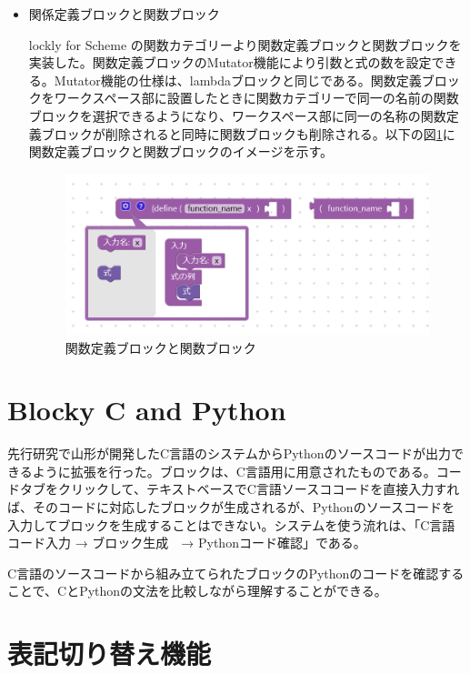 \documentclass{risepaper}
\begin{document}
\begin{itemize}
\item 関係定義ブロックと関数ブロック

lockly for Scheme の関数カテゴリーより関数定義ブロックと関数ブロックを実装した。関数定義ブロックのMutator機能により引数と式の数を設定できる。Mutator機能の仕様は、lambdaブロックと同じである。関数定義ブロックをワークスペース部に設置したときに関数カテゴリーで同一の名前の関数ブロックを選択できるようになり、ワークスペース部に同一の名称の関数定義ブロックが削除されると同時に関数ブロックも削除される。以下の図\ref{fig:scheme_func}に関数定義ブロックと関数ブロックのイメージを示す。

\begin{figure}[h]
\begin{center}
\includegraphics[scale=0.5]{img/scheme_func.PNG}
\caption{関数定義ブロックと関数ブロック}%
\label{fig:scheme_func}
\end{center}%
\end{figure}%

\end{itemize} 
   
   \section{Blocky C and Python}
   
先行研究で山形が開発したC言語のシステムからPythonのソースコードが出力できるように拡張を行った。ブロックは、C言語用に用意されたものである。コードタブをクリックして、テキストベースでC言語ソースココードを直接入力すれば、そのコードに対応したブロックが生成されるが、Pythonのソースコードを入力してブロックを生成することはできない。システムを使う流れは、「C言語コード入力 → ブロック生成　→ Pythonコード確認」である。

C言語のソースコードから組み立てられたブロックのPythonのコードを確認することで、CとPythonの文法を比較しながら理解することができる。
   
   \section{表記切り替え機能}
   
\end{document}
